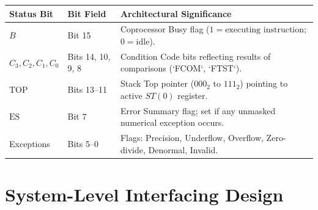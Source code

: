 \documentclass[12pt,a4paper]{article}
\begin{document}
\begin{tcolorbox}[formulabox, title={8087 Status Word Format and Condition Codes}]
\par\vspace{2pt}
\begingroup
\setlength{\extrarowheight}{2pt}
\noindent\begin{tabularx}{\linewidth}{|B{2.4cm}|B{2.0cm}|Y|}
\hline
\textbf{Status Bit} & \textbf{Bit Field} & \textbf{Architectural Significance} \\ \hline
$B$ & Bit 15 & Coprocessor Busy flag ($1 = \text{executing instruction}$; $0 = \text{idle}$). \\ \hline
$C_3, C_2, C_1, C_0$ & Bits 14, 10, 9, 8 & Condition Code bits reflecting results of comparisons (`FCOM`, `FTST`). \\ \hline
$\mathrm{TOP}$ & Bits 13--11 & Stack Top pointer ($000_2$ to $111_2$) pointing to active $ST(0)$ register. \\ \hline
$\mathrm{ES}$ & Bit 7 & Error Summary flag; set if any unmasked numerical exception occurs. \\ \hline
Exceptions & Bits 5--0 & Flags: Precision, Underflow, Overflow, Zero-divide, Denormal, Invalid. \\ \hline
\end{tabularx}\par
\endgroup
\end{tcolorbox}

\section{System-Level Interfacing Design}
\end{document}
